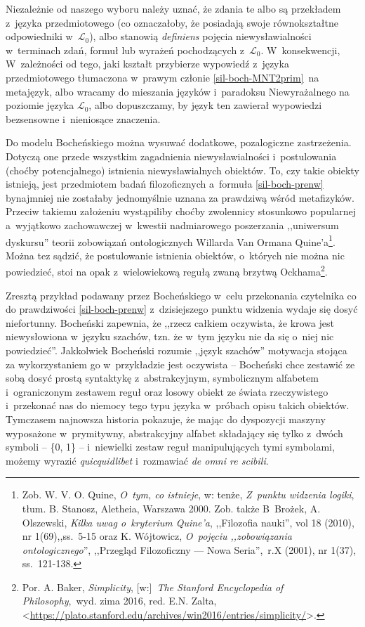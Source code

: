 Niezależnie od naszego wyboru należy uznać, że zdania te albo są przekładem z~języka przedmiotowego (co oznaczałoby, że posiadają swoje równokształtne odpowiedniki w~$\mathcal{L}_{0}$), albo stanowią \textit{definiens} pojęcia niewysławialności w~terminach zdań, formuł lub wyrażeń pochodzących z~$\mathcal{L}_{0}$. W~konsekwencji, W~zależności od tego, jaki kształt przybierze wypowiedź z~języka przedmiotowego tłumaczona w~prawym członie \ref{sil-boch-MNT2prim}\ na metajęzyk, albo wracamy do mieszania języków i~paradoksu Niewyrażalnego na poziomie języka $\mathcal{L}_{0}$, albo dopuszczamy, by język ten zawierał wypowiedzi bezsensowne i~nieniosące znaczenia.

Do modelu Bocheńskiego można wysuwać dodatkowe, pozalogiczne zastrzeżenia. Dotyczą one przede wszystkim zagadnienia niewysławialności i~postulowania (choćby potencjalnego) istnienia niewysławialnych obiektów. To, czy takie obiekty istnieją, jest przedmiotem badań filozoficznych a~formuła \eqref{sil-boch-prenw} bynajmniej nie zostałaby jednomyślnie uznana za prawdziwą wśród metafizyków. Przeciw takiemu założeniu wystąpiliby choćby zwolennicy stosunkowo popularnej a~wyjątkowo zachowawczej w~kwestii nadmiarowego poszerzania ,,uniwersum dyskursu'' teorii zobowiązań ontologicznych Willarda Van Ormana Quine'a\footnote{Zob. W. V. O. Quine, \textit{O~tym, co istnieje}, w: tenże, \textit{Z~punktu widzenia logiki}, tłum. B. Stanosz, Aletheia, Warszawa 2000. Zob. także B~Brożek, A. Olszewski, \textit{Kilka uwag o~kryterium Quine'a}, ,,Filozofia nauki'', vol 18 (2010), nr 1(69),,ss.~5-15 oraz K. Wójtowicz, \textit{O~pojęciu ,,zobowiązania ontologicznego}'', ,,Przegląd Filozoficzny — Nowa Seria'',~r.X (2001), nr 1(37), ss.~121-138.}. Można tez sądzić, że postulowanie istnienia obiektów, o~których nie można nic powiedzieć, stoi na opak z~wielowiekową regułą zwaną brzytwą Ockhama\footnote{Por. A. Baker, \textit{Simplicity}, [w:]~\textit{The Stanford Encyclopedia of Philosophy},~wyd. zima 2016, red. E.N. Zalta, {\textless}\url{https://plato.stanford.edu/archives/win2016/entries/simplicity/}{\textgreater}.}.

Zresztą przykład podawany przez Bocheńskiego w~celu przekonania czytelnika co do prawdziwości \eqref{sil-boch-prenw} z~dzisiejszego punktu widzenia wydaje się dosyć niefortunny. Bocheński zapewnia, że ,,rzecz całkiem oczywista, że krowa jest niewysłowiona w~języku szachów, tzn. że w~tym języku nie da się o~niej nic powiedzieć''. Jakkolwiek Bocheński rozumie ,,język szachów'' motywacja stojąca za wykorzystaniem go w~przykładzie jest oczywista -- Bocheński chce zestawić ze sobą dosyć prostą syntaktykę z~abstrakcyjnym, symbolicznym alfabetem i~ograniczonym zestawem reguł oraz losowy obiekt ze świata rzeczywistego i~przekonać nas do niemocy tego typu języka w~próbach opisu takich obiektów. Tymczasem najnowsza historia pokazuje, że mając do dyspozycji maszyny wyposażone w~prymitywny, abstrakcyjny alfabet składający się tylko z~dwóch symboli -- \{0, 1\} -- i~niewielki zestaw reguł manipulujących tymi symbolami, możemy wyrazić \textit{quicquidlibet} i~rozmawiać \textit{de omni re scibili}.

